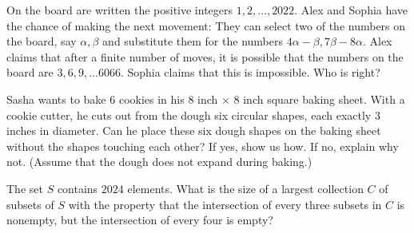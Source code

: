 

\begin{problem}[C][4][Cuba 2022/6]
    On the board are written the positive integers $1, 2, \ldots, 2022$. Alex and Sophia have the chance of making the next movement:
    They can select two of the numbers on the board, say $\alpha, \beta$ and substitute them for the numbers $4 \alpha - \beta, 7 \beta - 8 \alpha$. Alex claims that after a finite number of moves, it is possible that the numbers on the board are $3, 6, 9, \ldots 6066$. Sophia claims that this is impossible. Who is right?
\end{problem}

\begin{problem}[C][6][BAMO 2024/2]
    Sasha wants to bake 6 cookies in his 8 inch × 8 inch square baking sheet. With a cookie cutter, he cuts out from the dough six circular shapes, each exactly 3 inches in diameter. Can he place these six dough shapes on the baking sheet without the shapes touching each other? If yes, show us how. If no, explain why not. (Assume that the dough does not expand during baking.)
\end{problem}


\begin{problem}[C][3][MP4G 2024/14]
    The set $S$ contains $2024$ elements. What is the size of a largest collection $C$ of subsets of $S$ with the property that the intersection of every three subsets in $C$ is nonempty,
  but the intersection of every four is empty?
\end{problem}


